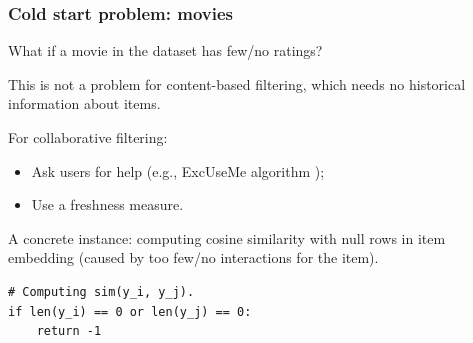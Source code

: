 \documentclass[xcolor = {table}]{beamer}
\begin{document}
  \begin{frame}[fragile]
    \frametitle{Cold start problem: movies}

    What if a movie in the dataset has few/no ratings? 

    \vspace{1em}

    This is not a problem for content-based filtering, which needs no historical information about items.

    \vspace{1em}

    For collaborative filtering:

    \vspace{0.5em}

    \begin{itemize}
      \item Ask users for help (e.g., ExcUseMe algorithm \cite{useme});
      \item Use a freshness measure.
    \end{itemize}

    \vspace{0.5em}

    \pause

    A concrete instance: computing cosine similarity with null rows in item embedding (caused by too few/no interactions for the item).

    \vspace{0.5em}

    \begin{lstlisting}[basicstyle=\footnotesize]
# Computing sim(y_i, y_j).
if len(y_i) == 0 or len(y_j) == 0:
    return -1
    \end{lstlisting}



  \end{frame}
\end{document}
